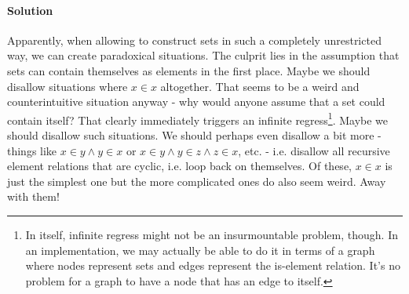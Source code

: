 \paragraph{Solution} Apparently, when allowing to construct sets in such a completely unrestricted way, we can create paradoxical situations. The culprit lies in the assumption that sets can contain themselves as elements in the first place. Maybe we should disallow situations where $x \in x$ altogether. That seems to be a weird and counterintuitive situation anyway - why would anyone assume that a set could contain itself? That clearly immediately triggers an infinite regress\footnote{In itself, infinite regress might not be an insurmountable problem, though. In an implementation, we may actually be able to do it in terms of a graph where nodes represent sets and edges represent the is-element relation. It's no problem for a graph to have a node that has an edge to itself.}. Maybe we should disallow such situations. We should perhaps even disallow a bit more - things like $x \in y \wedge y \in x$ or $x \in y \wedge y \in z \wedge z \in x$, etc. - i.e. disallow all recursive element relations that are cyclic, i.e. loop back on themselves. Of these, $x \in x$ is just the simplest one but the more complicated ones do also seem weird. Away with them!







